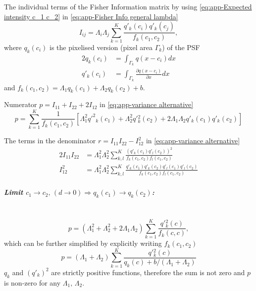 The individual terms of the Fisher Information matrix by using \autoref{eq:app-Expected intensity c_1 c_2} in \autoref{eq:app-Fisher Info general lambda}
%
\begin{equation}
	I_{ij} =\Lambda_i\Lambda_j\sum_{k=1}^K\frac{q'_k(c_i)q'_k(c_j)}{f_k(c_1,c_2)},
	\label{eq:app-Fisher Information alternative - Individual}
\end{equation}
%
where $q_k(c_i)$ is the pixelised version (pixel area $\Gamma_k$) of the PSF
%
\begin{alignat*}{2}
	q_k(c_i) & =\int_{\Gamma_k}q(x-c_i)dx\\
	q'_k(c_i) & =\int_{\Gamma_k}\frac{\partial q(x-c_i)}{\partial x}dx
\end{alignat*}
%
and $f_k(c_1,c_2)=\Lambda_1q_k(c_1)+\Lambda_2q_k(c_2)+b$.
 
Numerator $p=I_{11}+I_{22}+2I_{12}$ in \autoref{eq:app-variance alternative}
\begin{equation}
	p=\sum_{k=1}^K\frac{1}{f_k(c_1,c_2)}\left[\Lambda_1^2q'^2{}_k(c_1)+\Lambda_2^2q'{}_k^2(c_2)+2\Lambda_1\Lambda_2q'_k(c_1)q'_k(c_2)\right]
\end{equation}

The terms in the denominator $r=I_{11}I_{22}-I_{12}^2$ in \autoref{eq:app-variance alternative}
%
\begin{alignat*}{2}
	I_{11}I_{22} & =\Lambda_1^2\Lambda_2^2\sum_{k,l}^K\frac{\left(q'_k(c_1)q'_l(c_2)\right)^2}{f_k(c_1,c_2)f_l(c_1,c_2)}\\
	I_{12}^2 & =\Lambda_1^2\Lambda_2^2\sum_{k,l}^K\frac{q'_k(c_1)q'_k(c_2)q'_l(c_1)q'_l(c_2)}{f_k(c_1,c_2)f_l(c_1,c_2)}
\end{alignat*}

\subparagraph*{Limit $c_1\rightarrow c_2,\,(d\rightarrow0)\Rightarrow q_k(c_1)\rightarrow q_k(c_2)$:}\ \\
%
\begin{equation}
	p=(\Lambda_1^2+\Lambda_2^2+2\Lambda_1\Lambda_2)\sum_{k=1}^K\frac{q'{}_k^2(c)}{f_k(c,c)},
\end{equation}
%
which can be further simplified by explicitly writing $f_k(c_1,c_2)$
%
\begin{equation}
	p=(\Lambda_1+\Lambda_2)\sum_{k=1}^K\frac{q'{}_k^2(c)}{q_k(c)+b/(\Lambda_1+\Lambda_2)}
\end{equation}
%
$q_k$ and $(q'_k)^2$ are strictly positive functions, therefore the sum is not zero and $p$ is non-zero for any $\Lambda_1,\,\Lambda_2$. 

